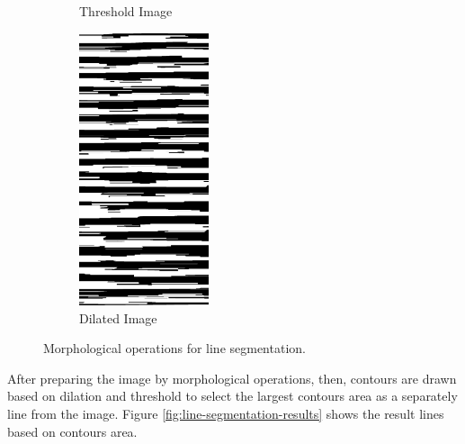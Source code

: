 \begin{figure}[H]
\begin{subfigure}[b]{0.3\textwidth}
         \caption{Threshold Image}
         \label{fig:test_Threshold}
     \end{subfigure}
     \hfill%
      \begin{subfigure}[b]{0.3\textwidth}
         \centering
         \includegraphics[width=\textwidth, height=8cm]{images/line_step7.png}
         \caption{Dilated Image}
         \label{fig:test_Dilated}
     \end{subfigure}

        \caption{Morphological operations for line segmentation.}
        \label{fig:line_segmentation}
\end{figure}


After preparing the image by morphological operations, then, contours are drawn based on dilation and threshold to select the largest contours area as a separately line from the image. Figure \ref{fig:line-segmentation-results} shows the result lines based on contours area.

